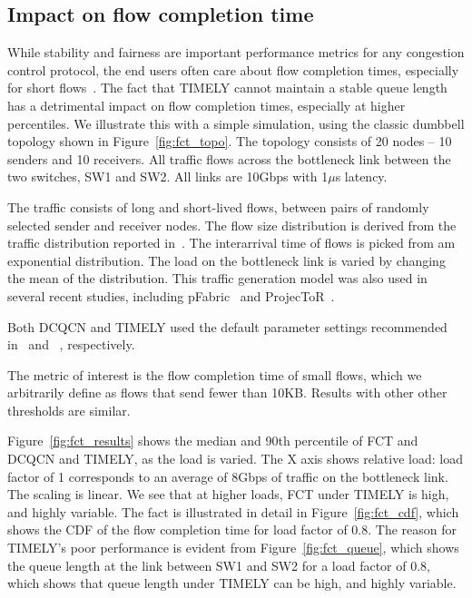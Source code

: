 \subsection {Impact on flow completion time}

While stability and fairness are important performance metrics for any
congestion control protocol, the end users often care about flow completion
times, especially for short flows~\cite{rcp}. The fact that TIMELY cannot
maintain a stable queue length has a detrimental impact on flow completion
times, especially at higher percentiles. We illustrate this with a simple
simulation, using the classic dumbbell topology shown in
Figure~\ref{fig:fct_topo}. The topology consists of 20 nodes -- 10 senders and
10 receivers. All traffic flows across the bottleneck link between the two
switches, SW1 and SW2. All links are 10Gbps with 1$\mu$s latency.

The traffic consists  of long and short-lived flows, between pairs of randomly
selected sender and receiver nodes. The flow size distribution is derived from
the traffic distribution reported in~\cite{dctcp}. The interarrival time of
flows is picked from am exponential distribution. The load on the bottleneck
link is varied by changing the mean of the distribution. This traffic generation
model was also used in several recent studies, including pFabric~\cite{pfabric}
and ProjecToR~\cite{projector}. 

Both DCQCN and TIMELY used the default parameter settings recommended
in~\cite{dcqcn} and ~\cite{timely}, respectively. 

The metric of interest is the flow completion time of small flows, which we
arbitrarily define as flows that send fewer than 10KB. Results with other other
thresholds are similar.

Figure~\ref{fig:fct_results} shows the median and 90th percentile of FCT and
DCQCN and TIMELY, as the load is varied.  The X axis shows relative load: load
factor of 1 corresponds to an average of 8Gbps of traffic on the bottleneck
link. The scaling is linear. We see that at higher loads, FCT under TIMELY is
high, and highly variable. The fact is illustrated in detail in
Figure~\ref{fig:fct_cdf}, which shows the CDF of the flow completion time for
load factor of 0.8. The reason for TIMELY's poor performance is evident from
Figure~\ref{fig:fct_queue}, which shows the queue length at the link between
SW1 and SW2 for a load factor of 0.8, which shows that queue length under TIMELY
can be high, and highly variable.

